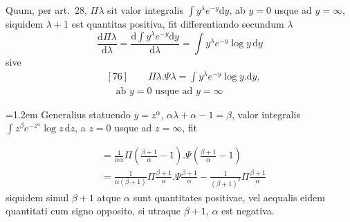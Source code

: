 Quum, per art.~28, $\Pi\lambda$ sit valor integralis $\int y^\lambda e^{-y}\mathrm{d}y$, ab $y=0$ usque ad $y=\infty$, siquidem $\lambda+1$ est quantitas positiva, fit differentiando secundum $\lambda$
\[
\frac{\mathrm{d}\Pi\lambda}{\mathrm{d}\lambda}
=\frac{\mathrm{d}\int y^\lambda e^{-y}\mathrm{d}y}{\mathrm{d}\lambda}
=\int y^\lambda e^{-y}\log y\,\mathrm{d}y
\]
sive
\[
\begin{aligned}
&[76]\qquad \Pi\lambda.\Psi\lambda=\int y^\lambda e^{-y}\log y.\mathrm{d}y,\\[4pt]
&\quad\text{ab }y=0\text{ usque ad }y=\infty
\end{aligned}
\]
\par{}
{\raggedright\parindent=1.2em Generalius statuendo $y=z^\alpha$, $\alpha\lambda+\alpha-1=\beta$, valor integralis $\int z^\beta e^{-z^\alpha}\log z\,\mathrm{d}z$, a $z=0$ usque ad $z=\infty$, fit\par}
\[
\begin{aligned}
&=\frac{1}{\alpha\alpha}\Pi\left(\frac{\beta+1}{\alpha}-1\right).\Psi\left(\frac{\beta+1}{\alpha}-1\right)
\\[4pt]
&=\frac{1}{\alpha(\beta+1)}\Pi\frac{\beta+1}{\alpha}.\Psi\frac{\beta+1}{\alpha}
-\frac{1}{(\beta+1)^2}\Pi\frac{\beta+1}{\alpha}
\end{aligned}
\]
siquidem simul $\beta+1$ atque $\alpha$ sunt quantitates positivae, vel aequalis eidem quantitati cum signo opposito, si utraque $\beta+1$, $\alpha$ est negativa.

